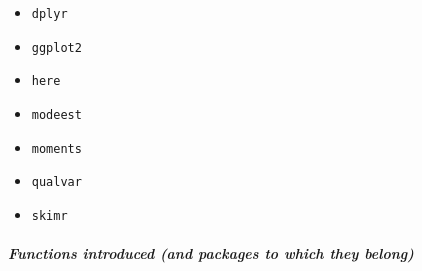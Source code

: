 \documentclass[
]{book}
\providecommand{\tightlist}{%
  \setlength{\itemsep}{0pt}\setlength{\parskip}{0pt}}
\begin{document}
\begin{itemize}
\tightlist
\item
  \texttt{dplyr}
\item
  \texttt{ggplot2}
\item
  \texttt{here}
\item
  \texttt{modeest}
\item
  \texttt{moments}
\item
  \texttt{qualvar}
\item
  \texttt{skimr}
\end{itemize}

\hypertarget{functions-introduced-and-packages-to-which-they-belong-3}{%
\paragraph*{\texorpdfstring{\emph{Functions introduced (and packages to which they belong)}}{Functions introduced (and packages to which they belong)}}\label{functions-introduced-and-packages-to-which-they-belong-3}}
\end{document}
